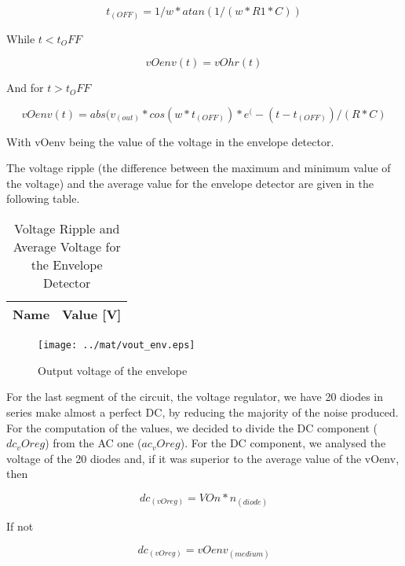\begin{equation}
t_(OFF) = 1/w * atan(1/(w*R1*C))
\label{eq:1.1}
\end{equation}

While $t<t_OFF$

\begin{equation}
vOenv (t) = vOhr (t)
\label{eq:1.2}
\end{equation}

And for $t>t_OFF$

\begin{equation}
vOenv (t) = abs(v_(out)*cos(w*t_(OFF))*e^(-(t-t_(OFF))/(R*C)
\label{eq:1.3}
\end{equation}

With vOenv being the value of the voltage in the envelope detector.

The voltage ripple (the difference between the maximum and minimum value of the voltage) and the average value for the envelope detector are given in the following table.

\begin{table}[H]
  \centering
  \begin{tabular}{|l|r|}
    \hline    
    {\bf Name} & {\bf Value [V]} \\ \hline
    
  \end{tabular}
  \caption{Voltage Ripple and Average Voltage for the Envelope Detector}
  \label{tab:mat3}
\end{table}

\begin{figure}[H] \centering
\texttt{[image: ../mat/vout\_env.eps]}
\caption{Output voltage of the envelope}
\label{fig:mat4}
\end{figure}

For the last segment of the circuit, the voltage regulator, we have 20 diodes in series make almost a perfect DC, by reducing the majority of the noise produced. For the computation of the values, we decided to divide the DC component ($dc_vOreg$) from the AC one ($ac_vOreg$).
For the DC component, we analysed the voltage of the 20 diodes and, if it was superior to the average value of the vOenv, then

\begin{equation}
dc_(vOreg) = VOn*n_(diode)
\label{eq:1.4}
\end{equation}

If not

\begin{equation}
dc_(vOreg) = vOenv_(medium)
\label{eq:1.5}
\end{equation}

